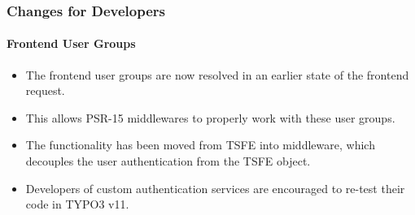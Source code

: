 %

\begin{frame}[fragile]
	\frametitle{Changes for Developers}
	\framesubtitle{Frontend User Groups}


	\begin{itemize}
		\item The frontend user groups are now resolved in an earlier state of
			the frontend request.
		\item This allows PSR-15 middlewares to properly work with these user groups.
		\item The functionality has been moved from TSFE into middleware,
			which decouples the user authentication from the TSFE object.
		\item Developers of custom authentication services are encouraged to
			re-test their code in TYPO3 v11.
	\end{itemize}

\end{frame}

